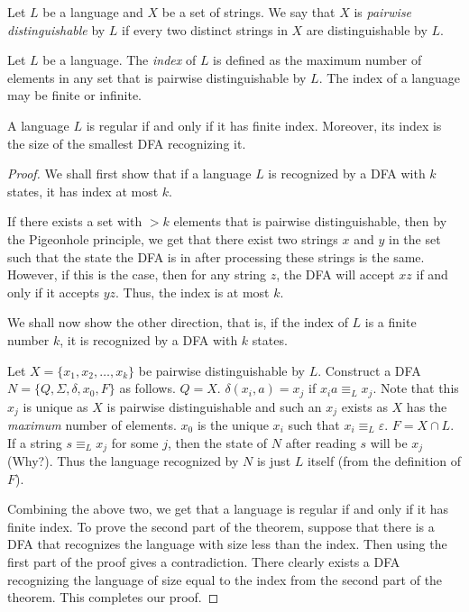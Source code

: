 \begin{definition}
Let $L$ be a language and $X$ be a set of strings. We say that $X$ is \textit{pairwise distinguishable} by $L$ if every two distinct strings in $X$ are distinguishable by $L$. 
\end{definition}
\begin{definition}
Let $L$ be a language. The \textit{index} of $L$ is defined as the maximum number of elements in any set that is pairwise distinguishable by $L$. The index of a language may be finite or infinite.
\end{definition}
\begin{theorem}
A language $L$ is regular if and only if it has finite index. Moreover, its index is the size of the smallest DFA recognizing it.
\end{theorem}
\begin{proof}
We shall first show that if a language $L$ is recognized by a DFA with $k$ states, it has index at most $k$.

If there exists a set with $> k$ elements that is pairwise distinguishable, then by the Pigeonhole principle, we get that there exist two strings $x$ and $y$ in the set such that the state the DFA is in after processing these strings is the same. However, if this is the case, then for any string $z$, the DFA will accept $xz$ if and only if it accepts $yz$. Thus, the index is at most $k$.

\vspace{2mm}
We shall now show the other direction, that is, if the index of $L$ is a finite number $k$, it is recognized by a DFA with $k$ states.

Let $X=\{x_1,x_2,\ldots,x_k\}$ be pairwise distinguishable by $L$. Construct a DFA $N=\{Q,\Sigma,\delta,x_0,F\}$ as follows. $Q=X$. $\delta(x_i,a)=x_j$ if $x_ia\equiv_Lx_j$. Note that this $x_j$ is unique as $X$ is pairwise distinguishable and such an $x_j$ exists as $X$ has the \textit{maximum} number of elements. $x_0$ is the unique $x_i$ such that $x_i\equiv_L\varepsilon$. $F=X\cap L$. If a string $s\equiv_Lx_j$ for some $j$, then the state of $N$ after reading $s$ will be $x_j$ (Why?). Thus the language recognized by $N$ is just $L$ itself (from the definition of $F$).

\vspace{2mm}
Combining the above two, we get that a language is regular if and only if it has finite index. To prove the second part of the theorem, suppose that there is a DFA that recognizes the language with size less than the index. Then using the first part of the proof gives a contradiction. There clearly exists a DFA recognizing the language of size equal to the index from the second part of the theorem. This completes our proof.
\end{proof}
\clearpage

